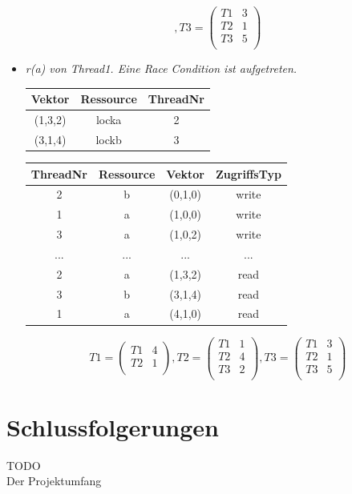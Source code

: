 \documentclass[10pt,a4paper]{article}
\begin{document}
\begin{itemize}
\[	, T3 = \begin{pmatrix}
		T1 & 3\\
		T2 & 1\\		
		T3 & 5\\
	\end{pmatrix}
\]
\item \textit{r(a) von Thread1. Eine Race Condition ist aufgetreten.}\\[0.2cm]
\begin{tabular}{ >{\small}c >{\small}c >{\small}c }
  	Vektor & Ressource & ThreadNr \\\hline
  	(1,3,2) & locka & 2 \\
  	(3,1,4) & lockb & 3 \\\hline
\end{tabular}\hspace*{0.5cm}
\begin{tabular}{ >{\small}c >{\small}c >{\small}c >{\small}c }
  	ThreadNr & Ressource & Vektor & ZugriffsTyp \\\hline
  	2 & b & (0,1,0) & write \\
  	1 & a & (1,0,0) & write \\
  	\color{red}3 & \color{red}a & \color{red}(1,0,2) & \color{red}write \\
  	... & ... & ... & ... \\
  	2 & a & (1,3,2) & read \\
  	3 & b & (3,1,4) & read \\
  	\color{red}1 & \color{red}a & \color{red}(4,1,0) & \color{red}read \\\hline
\end{tabular}
\[
	T1 = \begin{pmatrix}
		T1 & 4\\
		T2 & 1\\
	\end{pmatrix}
	, T2 = \begin{pmatrix}
		T1 & 1\\		
		T2 & 4\\
		T3 & 2\\
	\end{pmatrix}
	, T3 = \begin{pmatrix}
		T1 & 3\\
		T2 & 1\\		
		T3 & 5\\
	\end{pmatrix}
\]
\end{itemize}
\newpage
\section{Schlussfolgerungen}
TODO\\
Der Projektumfang 
\end{document}
